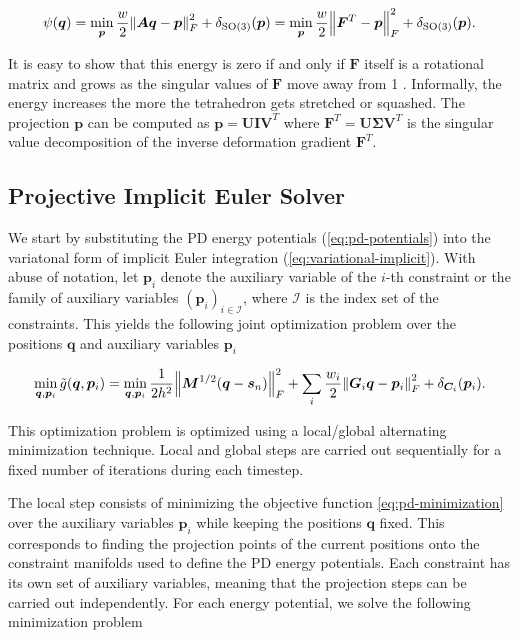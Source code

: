 \begin{equation}\label{eq:pd-strain}
    \psi({\bm{q}}) = \min_{\bm{p}} \frac{w}{2} \norm{\bm{Aq} - \bm{p}}^2_F + \delta_{\text{SO}(3)}(\bm{p})
    = \min_{\bm{p}} \frac{w}{2} \norm{\bm{F}^T - \bm{p}}^2_F + \delta_{\text{SO}(3)}(\bm{p}).
\end{equation}

\noindent It is easy to show that this energy is zero if and only if $\bm{F}$ itself is a rotational matrix and grows as the 
singular values of $\bm{F}$ move away from 1 \cite{bouaziz2014}. Informally, the energy increases the more the tetrahedron gets 
stretched or squashed. The projection $\bm{p}$ can be computed 
as $\bm{p} = \bm{UIV}^T$ where $\bm{F}^T = \bm{U \Sigma V}^T$ is the singular value decomposition of the inverse deformation 
gradient $\bm{F}^T$.

\subsection{Projective Implicit Euler Solver}\label{ss:pd-solver}
We start by substituting the PD energy potentials (\cref{eq:pd-potentials}) into the variatonal form of implicit Euler integration
(\cref{eq:variational-implicit}). With abuse of notation, let $\bm{p}_i$ denote the auxiliary variable of the $i$-th constraint or 
the family of auxiliary variables $(\bm{p}_i)_{i \in \mathcal{I}}$, where $\mathcal{I}$ is the index set of the 
constraints. This yields the following joint optimization problem over the positions $\bm{q}$ and auxiliary variables $\bm{p}_i$ 

\begin{equation}\label{eq:pd-minimization}
    \min_{\bm{q}, \bm{p}_i} \tilde{g}(\bm{q}, \bm{p}_i) = 
    \min_{\bm{q}, \bm{p}_i} \frac{1}{2h^2} \norm{\bm{M}^{1/2}(\bm{q} - \bm{s}_n)}^2_F + \sum_i \frac{w_i}{2} \norm{\bm{G}_i\bm{q}
    - \bm{p}_i}^2_F + \delta_{\bm{C}_i}(\bm{p}_i).
\end{equation}

\noindent This optimization problem is optimized using a local/global alternating minimization technique. Local and global steps 
are carried out sequentially for a fixed number of iterations during each timestep. 

The local step consists of minimizing the objective function \cref{eq:pd-minimization} over 
the auxiliary variables $\bm{p}_i$ while keeping the positions $\bm{q}$ fixed. This corresponds to finding the projection points of 
the current positions onto the constraint manifolds used to define the PD energy potentials. Each constraint has its own 
set of auxiliary variables, meaning that the projection steps can be carried out independently. For each energy potential, we solve the 
following minimization problem


